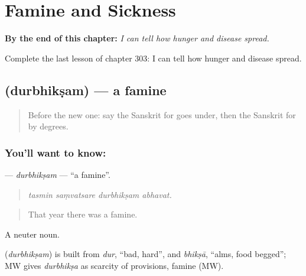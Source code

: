 
\chapter{Famine and Sickness}
\label{ch:sa-famine-and-sickness}

\begin{chapteropening}
\textbf{By the end of this chapter:} \emph{I can tell how hunger and disease spread.}

Complete the last lesson of chapter 303: I can tell how hunger and disease spread.
\end{chapteropening}

\section[\texorpdfstring{\sk{दुर्भिक्षम्} (durbhikṣam)}{दुर्भिक्षम् (durbhikṣam)}]{ (durbhikṣam) — a famine}

\label{lesson:SA-C303-durbhiksam}



\begin{quote}
Before the new one: say the Sanskrit for goes under, then the Sanskrit for by degrees.
\end{quote}

\subsection*{You'll want to know: }
\textbf{} — \emph{durbhikṣam} — \textquotedblleft{}a famine\textquotedblright{}.

\begin{quote}
   
\end{quote}

\begin{quote}
\emph{tasmin saṃvatsare durbhikṣam abhavat.}
\end{quote}

\begin{quote}
That year there was a famine.
\end{quote}

A neuter noun.

\begin{cousinweb}
\textbf{} (\emph{durbhikṣam}) is built from \emph{dur}, \textquotedblleft{}bad, hard\textquotedblright{}, and \emph{bhikṣā}, \textquotedblleft{}alms, food begged\textquotedblright{}; MW gives \emph{durbhikṣa} as scarcity of provisions, famine (MW).
\end{cousinweb}

